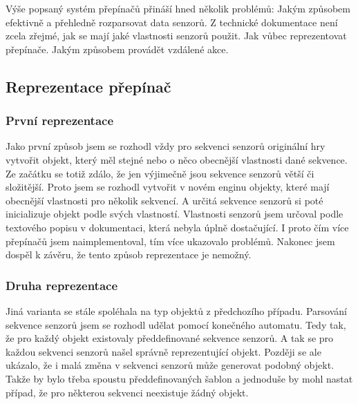 Výše popsaný systém přepínačů přináší hned několik problémů:
	Jakým způsobem efektivně a přehledně rozparsovat data senzorů.
	Z technické dokumentace není zcela zřejmé, jak se mají jaké vlastnosti senzorů použit.
	Jak vůbec reprezentovat přepínače.
	Jakým způsobem provádět vzdálené akce.


\subsection{Reprezentace přepínač}
\subsubsection{První reprezentace}
Jako první způsob jsem se rozhodl vždy pro sekvenci senzorů originální hry vytvořit objekt, který měl stejné nebo o něco obecnější vlastnosti dané sekvence.
Ze začátku se totiž zdálo, že jen výjimečně jsou sekvence senzorů větší či složitější. Proto jsem se rozhodl vytvořit v
novém enginu objekty, které mají obecnější vlastnosti pro několik sekvencí. A určitá sekvence senzorů si poté
inicializuje objekt podle svých vlastností. Vlastnosti senzorů jsem určoval podle textového popisu v dokumentaci, která nebyla úplně dostačující. 
I proto čím více přepínačů jsem naimplementoval, tím více ukazovalo problémů. Nakonec jsem dospěl k závěru, že tento způsob reprezentace je nemožný.

\subsubsection{Druha reprezentace}
Jiná varianta se stále spoléhala na typ objektů z předchozího případu. Parsování sekvence senzorů jsem se rozhodl udělat pomocí konečného 
automatu. Tedy tak,  že pro každý objekt existovaly předdefinované sekvence senzorů. A tak se pro každou sekvenci senzorů našel správně 
reprezentující objekt. Později se ale ukázalo, že i malá změna v sekvenci senzorů může generovat podobný objekt. Takže by bylo třeba
spoustu předdefinovaných šablon a jednoduše by mohl nastat případ, že pro některou sekvenci neexistuje žádný objekt.

